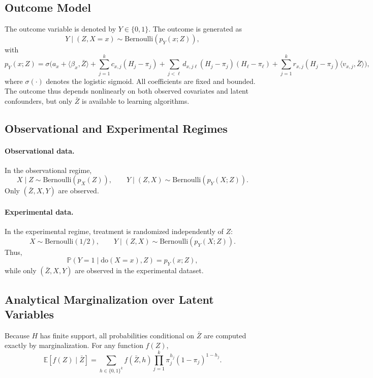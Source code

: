 \documentclass[accepted]{uai2026} %
\theoremstyle{plain}
\theoremstyle{definition}
\theoremstyle{remark}
\begin{document}
\subsection{Outcome Model}

The outcome variable is denoted by $Y \in \{0,1\}$.
The outcome is generated as
\[
Y \mid (Z,X=x) \sim \mathrm{Bernoulli}\!\left(p_Y(x;Z)\right),
\]
with
\begin{equation}
\label{eq:outcome-model}
p_Y(x;Z)
=
\sigma\!\Big(
a_x
+ \langle \beta_x, \bar{Z} \rangle
+ \sum_{j=1}^k c_{x,j}(H_j - \pi_j)
+ \sum_{j<\ell} d_{x,j\ell}(H_j - \pi_j)(H_\ell - \pi_\ell)
+ \sum_{j=1}^k r_{x,j}(H_j - \pi_j)\langle v_{x,j}, \bar{Z} \rangle
\Big),
\end{equation}
where $\sigma(\cdot)$ denotes the logistic sigmoid.
All coefficients are fixed and bounded.
The outcome thus depends nonlinearly on both observed covariates and latent
confounders, but only $\bar{Z}$ is available to learning algorithms.

\subsection{Observational and Experimental Regimes}

\paragraph{Observational data.}
In the observational regime,
\[
X \mid Z \sim \mathrm{Bernoulli}(p_X(Z)),
\qquad
Y \mid (Z,X) \sim \mathrm{Bernoulli}(p_Y(X;Z)).
\]
Only $(\bar{Z},X,Y)$ are observed.

\paragraph{Experimental data.}
In the experimental regime, treatment is randomized independently of $Z$:
\[
X \sim \mathrm{Bernoulli}(1/2),
\qquad
Y \mid (Z,X) \sim \mathrm{Bernoulli}(p_Y(X;Z)).
\]
Thus,
\[
\mathbb{P}(Y=1 \mid \mathrm{do}(X=x), Z) = p_Y(x;Z),
\]
while only $(\bar{Z},X,Y)$ are observed in the experimental dataset.

\subsection{Analytical Marginalization over Latent Variables}

Because $H$ has finite support, all probabilities conditional on $\bar{Z}$
are computed exactly by marginalization.
For any function $f(Z)$,
\[
\mathbb{E}[f(Z)\mid \bar{Z}]
=
\sum_{h \in \{0,1\}^k}
f(\bar{Z},h)
\prod_{j=1}^k \pi_j^{h_j}(1-\pi_j)^{1-h_j}.
\]
\end{document}

